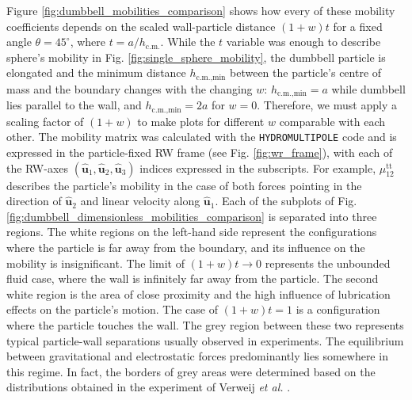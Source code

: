 \documentclass{master_thesis}
\def\code#1{\texttt{#1}}
\begin{document}
Figure \ref{fig:dumbbell_mobilities_comparison} shows how every of these mobility coefficients depends on the scaled wall-particle distance $(1+w)t$ for a fixed angle $\theta = 45^{\circ}$, where $t=a/h_{\textrm{c.m.}}$. While the $t$ variable was enough to describe sphere's mobility in Fig. \ref{fig:single_sphere_mobility}, the dumbbell particle is elongated and the minimum distance $h_{\textrm{c.m.,min}}$ between the particle's centre of mass and the boundary changes with the changing $w$: $h_{\textrm{c.m.,min}}=a$ while dumbbell lies parallel to the wall, and $h_{\textrm{c.m.,min}}=2a$ for $w=0$. Therefore, we must apply a scaling factor of $(1+w)$ to make plots for different $w$ comparable with each other. The mobility matrix was calculated with the \code{HYDROMULTIPOLE} code and is expressed in the particle-fixed RW frame (see Fig. \ref{fig:wr_frame}), with each of the RW-axes $(\hat{\boldsymbol{u}}_1, \hat{\boldsymbol{u}}_2, \hat{\boldsymbol{u}}_3)$ indices expressed in the subscripts. For example, $\mu^{\textrm{tt}}_{12}$ describes the particle's mobility in the case of both forces pointing in the direction of $\hat{\boldsymbol{u}}_2$ and linear velocity along $\hat{\boldsymbol{u}}_1$. Each of the subplots of Fig. \ref{fig:dumbbell_dimensionless_mobilities_comparison} is separated into three regions. The white regions on the left-hand side represent the configurations where the particle is far away from the boundary, and its influence on the mobility is insignificant. The limit of $(1+w)t \rightarrow 0$ represents the unbounded fluid case, where the wall is infinitely far away from the particle. The second white region is the area of close proximity and the high influence of lubrication effects on the particle's motion. The case of $(1+w)t = 1$ is a configuration where the particle touches the wall. The grey region between these two represents typical particle-wall separations usually observed in experiments. The equilibrium between gravitational and electrostatic forces predominantly lies somewhere in this regime. In fact, the borders of grey areas were determined based on the distributions obtained in the experiment of Verweij \textit{et al.} \cite{verweij2021}. 
\end{document}
